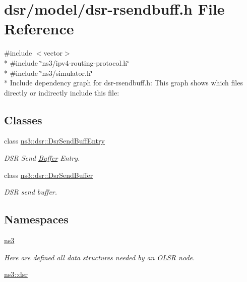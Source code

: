 \hypertarget{dsr-rsendbuff_8h}{}\section{dsr/model/dsr-\/rsendbuff.h File Reference}
\label{dsr-rsendbuff_8h}
{\ttfamily \#include $<$vector$>$}\\*
{\ttfamily \#include \char`\"{}ns3/ipv4-\/routing-\/protocol.\+h\char`\"{}}\\*
{\ttfamily \#include \char`\"{}ns3/simulator.\+h\char`\"{}}\\*
Include dependency graph for dsr-\/rsendbuff.h\+:
This graph shows which files directly or indirectly include this file\+:
\subsection*{Classes}
\begin{DoxyCompactItemize}
\item 
class \hyperlink{classns3_1_1dsr_1_1DsrSendBuffEntry}{ns3\+::dsr\+::\+Dsr\+Send\+Buff\+Entry}
\begin{DoxyCompactList}\small\item\em D\+SR Send \hyperlink{classns3_1_1Buffer}{Buffer} Entry. \end{DoxyCompactList}\item 
class \hyperlink{classns3_1_1dsr_1_1DsrSendBuffer}{ns3\+::dsr\+::\+Dsr\+Send\+Buffer}
\begin{DoxyCompactList}\small\item\em D\+SR send buffer. \end{DoxyCompactList}\end{DoxyCompactItemize}
\subsection*{Namespaces}
\begin{DoxyCompactItemize}
\item 
 \hyperlink{namespacens3}{ns3}
\begin{DoxyCompactList}\small\item\em Here are defined all data structures needed by an O\+L\+SR node. \end{DoxyCompactList}\item 
 \hyperlink{namespacens3_1_1dsr}{ns3\+::dsr}
\end{DoxyCompactItemize}
